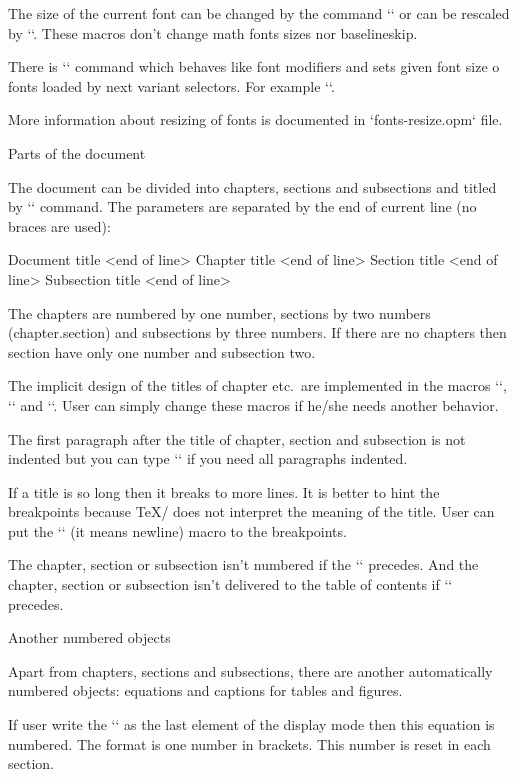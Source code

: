 The size of the current font can be changed by the command
`` or can be rescaled by
`\thefontscale[<factor>]`. These macros don't change math fonts sizes nor
baselineskip.

\new
There is `` command which behaves like
font modifiers and sets given font size o fonts loaded by next variant selectors. 
For example `\currvar`.

More information about resizing of fonts is documented in `fonts-resize.opm`
file. 


\sec Parts of the document

The document can be divided into chapters, sections and subsections and titled
by `\tit` command. The parameters are separated by the end of current line (no
braces are used):

\begtt
\tit Document title <end of line>
\chap Chapter title <end of line>
\sec Section title <end of line>
\secc Subsection title <end of line>
\endtt

The chapters are numbered by one number, sections by two numbers
(chapter.section) and subsections by three numbers. If there are no chapters
then section have only one number and subsection two.

The implicit design of the titles of chapter etc.\ are implemented in the
macros `\printchap`, `\printsec` and `\printsecc`. User can simply change
these macros if he/she needs another behavior.

The first paragraph after the title of chapter, section and subsection is
not indented but you can type `\let\firstnoindent=\relax` if you need all
paragraphs indented.

If a title is so long then it breaks to more lines. It is better to hint the
breakpoints because \TeX/ does not interpret the meaning of the title.
User can put the `\nl` (it means newline) macro to the breakpoints.

The chapter, section or subsection isn't numbered if the `\nonum` precedes.
And the chapter, section or subsection isn't delivered to the table of
contents if `\notoc` precedes.


\sec Another numbered objects

Apart from chapters, sections and subsections, there are another
automatically numbered objects: equations and captions for tables and
figures.

If user write the `\eqmark` as the last element of the display mode then
this equation is numbered. The format is one number in brackets. This number
is reset in each section. 

